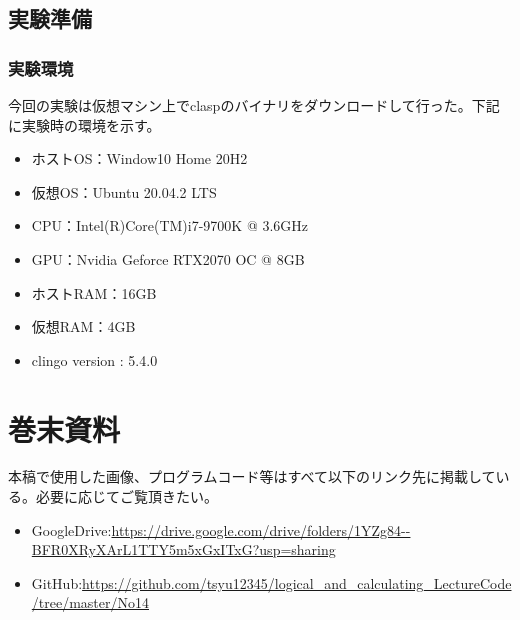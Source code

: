 \documentclass[dvipdfmx]{jsarticle}
\begin{document}
\subsection{実験準備}
  \subsubsection{実験環境}
  今回の実験は仮想マシン上でclaspのバイナリをダウンロードして行った。下記に実験時の環境を示す。
  \begin{itemize}
    \item ホストOS：Window10 Home 20H2
    \item 仮想OS：Ubuntu 20.04.2 LTS
    \item CPU：Intel(R)Core(TM)i7-9700K @ 3.6GHz
    \item GPU：Nvidia Geforce RTX2070 OC @ 8GB
    \item ホストRAM：16GB
    \item 仮想RAM：4GB
    \item clingo version : 5.4.0
  \end{itemize}

\section{巻末資料}
  本稿で使用した画像、プログラムコード等はすべて以下のリンク先に掲載している。必要に応じてご覧頂きたい。
  \begin{itemize}
    \item GoogleDrive:\url{https://drive.google.com/drive/folders/1YZg84--BFR0XRyXArL1TTY5m5xGxITxG?usp=sharing}
    \item GitHub:\url{https://github.com/tsyu12345/logical_and_calculating_LectureCode/tree/master/No14}
  \end{itemize}
\end{document}
